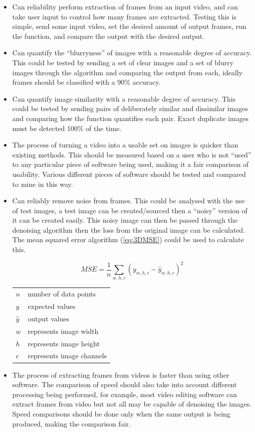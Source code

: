 \documentclass[11pt]{report}
\makeatletter
\newenvironment{conditions}
  {\par\vspace{\abovedisplayskip}\noindent\begin{tabular}{>{$}l<{$} @{${}={}$} l}}
  {\end{tabular}\par\vspace{\belowdisplayskip}}
\makeatother
\begin{document}
\begin{itemize}
\item Can reliability perform extraction of frames from an input video, and can take user input to control how many frames are extracted. Testing this is simple, send some input video, set the desired amount of output frames, run the function, and compare the output with the desired output.
\item Can quantify the ``blurryness'' of images with a reasonable degree of accuracy. This could be tested by sending a set of clear images and a set of blurry images through the algorithm and comparing the output from each, ideally frames should be classified with a 90\% accuracy.
\item Can quantify image similarity with a reasonable degree of accuracy. This could be tested by sending pairs of deliberately similar and dissimilar images and comparing how the function quantifies each pair. Exact duplicate images must be detected 100\% of the time.
\item The process of turning a video into a usable set on images is quicker than existing methods. This should be measured based on a user who is not ``used'' to any particular piece of software being used, making it a fair comparison of usability. Various different pieces of software should be tested and compared to mine in this way.
\item Can reliably remove noise from frames. This could be analysed with the use of test images, a test image can be created/sourced then a ``noisy'' version of it can be created easily. This noisy image can then be passed through the denoising algorithm then the loss from the original image can be calculated. The mean squared error algorithm (\ref{eq:3DMSE}) could be used to calculate this.
\begin{center}
\begin{equation}\label{eq:3DMSE}
MSE = \frac{1}{n} \sum_{w,h,c}(y_{w,h,c}-\hat{y}_{w,h,c})^2
\end{equation}
\begin{conditions}
 n & number of data points\\
 y & expected values\\
 \hat{y} & output values\\
 w & represents image width\\
 h & represents image height\\
 c & represents image channels
\end{conditions}
\end{center}
\item The process of extracting frames from videos is faster than using other software. The comparison of speed should also take into account different processing being performed, for example, most video editing software can extract frames from video but not all may be capable of denoising the images. Speed comparisons should be done only when the same output is being produced, making the comparison fair.
\end{itemize}
\end{document}
